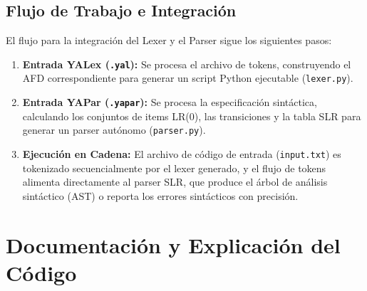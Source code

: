 \documentclass[12pt,letterpaper]{article}
\begin{document}
\subsection{Flujo de Trabajo e Integración}
El flujo para la integración del Lexer y el Parser sigue los siguientes pasos:
\begin{enumerate}
    \item \textbf{Entrada YALex (\texttt{.yal}):} Se procesa el archivo de tokens, construyendo el AFD correspondiente para generar un script Python ejecutable (\texttt{lexer.py}).
    \item \textbf{Entrada YAPar (\texttt{.yapar}):} Se procesa la especificación sintáctica, calculando los conjuntos de items LR(0), las transiciones y la tabla SLR para generar un parser autónomo (\texttt{parser.py}).
    \item \textbf{Ejecución en Cadena:} El archivo de código de entrada (\texttt{input.txt}) es tokenizado secuencialmente por el lexer generado, y el flujo de tokens alimenta directamente al parser SLR, que produce el árbol de análisis sintáctico (AST) o reporta los errores sintácticos con precisión.
\end{enumerate}

\section{Documentación y Explicación del Código}
\end{document}
